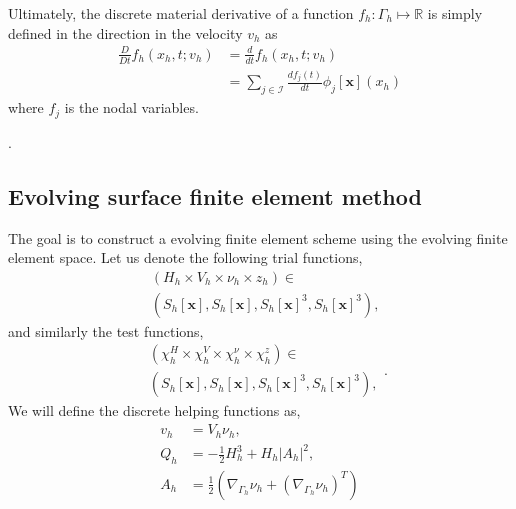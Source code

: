 Ultimately, the discrete material derivative of a function $f_{h}: \Gamma _{h} \mapsto  \mathbb{R} $ is simply defined in the direction in the velocity $v_{h}$  as \[
    \begin{split}
\frac{D}{Dt}f_{h}\left( x_{h}, t; v_{h}   \right) & = \frac{d}{dt} f_{h}\left( x_{h}, t; v_{h}   \right) \\
 & = \sum_{j \in \mathcal{I} }^{} \frac{d f_{j} \left( t \right) }{dt} \phi _{j}\left[ \mathbf{x} \right] \left( x_{h} \right)
    \end{split}
\]
where $f_{j}$ is the nodal variables.

.



\subsection{Evolving surface finite element method }%
\label{sub:surface_finite_element_method}


The goal is to construct a evolving finite element scheme using the evolving finite element space.
Let us denote the following trial functions,
\begin{equation}
\label{eq:FE_trial}
    \begin{split}
& ( H_{h} \times V_{h} \times \nu_{h}  \times z_{h} ) \in \\
&\left( S_{h}\left[ \mathbf{x} \right],S_{h}\left[ \mathbf{x} \right], S_{h}\left[ \mathbf{x} \right] ^3,S_{h}\left[ \mathbf{x} \right] ^3    \right),
    \end{split}
\end{equation}
and similarly the test functions,
\begin{equation}
\label{eq:FE_test}
    \begin{split}
& ( \chi_{h}^{H}  \times \chi_{h} ^{V} \times \chi_{h} ^{\nu }  \times \chi_{h} ^{z} ) \in \\
&\left( S_{h}\left[ \mathbf{x} \right],S_{h}\left[ \mathbf{x} \right], S_{h}\left[ \mathbf{x} \right] ^3,S_{h}\left[ \mathbf{x} \right] ^3    \right),
    \end{split}
.\end{equation}
We will define the discrete helping functions as,
\[
    \begin{split}
v_{h} & = V_{h}\nu_{h}, \\
Q_{h} & =  - \frac{1}{2} H_{h}^{3} + H_{h} \left\lvert A_{h} \right\rvert^2, \\
A_{h} & = \frac{1}{2}\left( \nabla _{\Gamma_{h} } \nu_{h} + \left( \nabla _{\Gamma _{h}}\nu _{h} \right) ^{T} \right)
    \end{split}
\]

